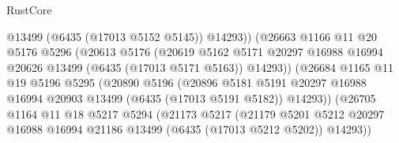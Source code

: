 \begin{lexlean}{RustCore}
\begin{coremodule}
                                    @13499
                                    (@6435 (@17013 @5152 @5145))
                                    @14293))
                                (@26663
                                  @1166
                                  @11
                                  @20
                                  @5176
                                  @5296
                                  (@20613
                                    @5176
                                    (@20619
                                      @5162
                                      @5171
                                      @20297
                                      @16988
                                      @16994
                                      @20626
                                      @13499
                                      (@6435 (@17013 @5171 @5163))
                                      @14293))
                                  (@26684
                                    @1165
                                    @11
                                    @19
                                    @5196
                                    @5295
                                    (@20890
                                      @5196
                                      (@20896
                                        @5181
                                        @5191
                                        @20297
                                        @16988
                                        @16994
                                        @20903
                                        @13499
                                        (@6435 (@17013 @5191 @5182))
                                        @14293))
                                    (@26705
                                      @1164
                                      @11
                                      @18
                                      @5217
                                      @5294
                                      (@21173
                                        @5217
                                        (@21179
                                          @5201
                                          @5212
                                          @20297
                                          @16988
                                          @16994
                                          @21186
                                          @13499
                                          (@6435 (@17013 @5212 @5202))
                                          @14293))

\end{coremodule}
\end{lexlean}
